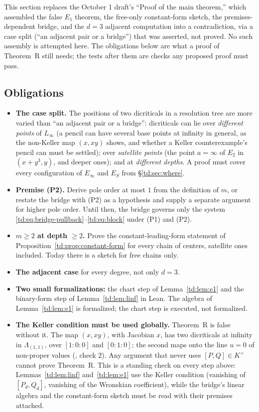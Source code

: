 \documentclass[a4paper,11pt]{article}
\newcommand{\filename}[1]{\texttt{\seqsplit{#1}}}
\theoremstyle{plain}
\theoremstyle{definition}
\theoremstyle{remark}
\begin{document}
This section replaces the October 1 draft's ``Proof of the main theorem,'' which assembled
the false $E_1$ theorem, the free-only constant-form sketch, the premises-dependent bridge,
and the $d = 3$ adjacent computation into a contradiction, via a case split (``an adjacent
pair or a bridge'') that was asserted, not proved. No such assembly is attempted here. The
obligations below are what a proof of Theorem~R still needs; the tests after them are checks
any proposed proof must pass.

\subsection{Obligations}

\begin{itemize}[nosep]
\item[\textbf{O1.}] \textbf{The case split.} The positions of two dicriticals in a resolution
tree are more varied than ``an adjacent pair or a bridge'': dicriticals can lie over
\emph{different points} of $L_\infty$ (a pencil can have several base points at infinity in
general, as the non-Keller map $(x, xy)$ shows, and whether a Keller counterexample's pencil
can must be settled); over \emph{satellite points} (the point $a = \infty$ of $E_2$ in
$(x + y^3, y)$, and deeper ones); and at \emph{different depths}. A proof must cover every
configuration of $E_\infty$ and $E_S$ from \S\ref{td:sec:where}.
\item[\textbf{O2.}] \textbf{Premise (P2).} Derive pole order at most $1$ from the definition of
$m$, or restate the bridge with (P2) as a hypothesis and supply a separate argument for
higher pole order. Until then, the bridge governs only the system
\eqref{td:eq:bridge-pullback}--\eqref{td:eq:block} under (P1) and (P2).
\item[\textbf{O3.}] \textbf{$m \geq 2$ at depth $\geq 2$.} Prove the constant-leading-form
statement of Proposition~\ref{td:prop:constant-form} for every chain of centers, satellite ones
included. Today there is a sketch for free chains only.
\item[\textbf{O4.}] \textbf{The adjacent case} for every degree, not only $d = 3$.
\item[\textbf{O5.}] \textbf{Two small formalizations:} the chart step of Lemma~\ref{td:lem:e1}
and the binary-form step of Lemma~\ref{td:lem:linf} in Lean. The algebra of Lemma~\ref{td:lem:e1}
is formalized; the chart step is executed, not formalized.
\item[\textbf{O6.}] \textbf{The Keller condition must be used globally.} Theorem~R is false
without it. The map $(x, xy)$, with Jacobian $x$, has two dicriticals at infinity in
$\Lambda_{(1,1)}$, over $[1 : 0 : 0]$ and $[0 : 1 : 0]$; the second maps onto the line $u = 0$
of non-proper values (\filename{restatement\_checks.py}, check $2$). Any argument that never
uses $[P,Q] \in K^\times$ cannot prove Theorem~R. This is a standing check on every step
above: Lemmas~\ref{td:lem:linf} and~\ref{td:lem:e1} use the Keller condition (vanishing of
$[P_d, Q_d]$, vanishing of the Wronskian coefficient), while the bridge's linear algebra and
the constant-form sketch must be read with their premises attached.
\end{itemize}
\end{document}
